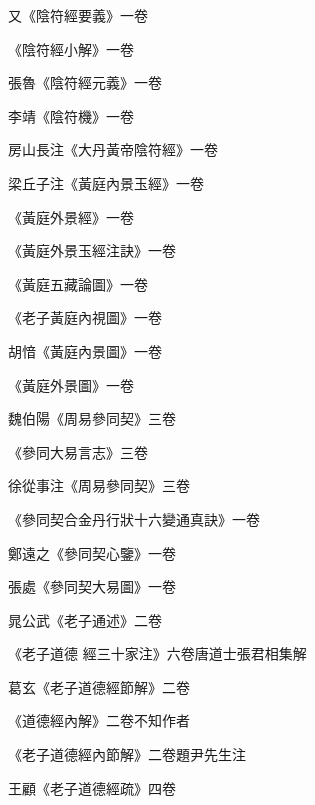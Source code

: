 \begin{pinyinscope}
 又《陰符經要義》一卷



 《陰符經小解》一卷



 張魯《陰符經元義》一卷



 李靖《陰符機》一卷



 房山長注《大丹黃帝陰符經》一卷



 梁丘子注《黃庭內景玉經》一卷



 《黃庭外景經》一卷



 《黃庭外景玉經注訣》一卷



 《黃庭五藏論圖》一卷



 《老子黃庭內視圖》一卷



 胡愔《黃庭內景圖》一卷



 《黃庭外景圖》一卷



 魏伯陽《周易參同契》三卷



 《參同大易言志》三卷



 徐從事注《周易參同契》三卷



 《參同契合金丹行狀十六變通真訣》一卷



 鄭遠之《參同契心鑒》一卷



 張處《參同契大易圖》一卷



 晁公武《老子通述》二卷



 《老子道德
 經三十家注》六卷唐道士張君相集解



 葛玄《老子道德經節解》二卷



 《道德經內解》二卷不知作者



 《老子道德經內節解》二卷題尹先生注



 王顧《老子道德經疏》四卷




\end{pinyinscope}
